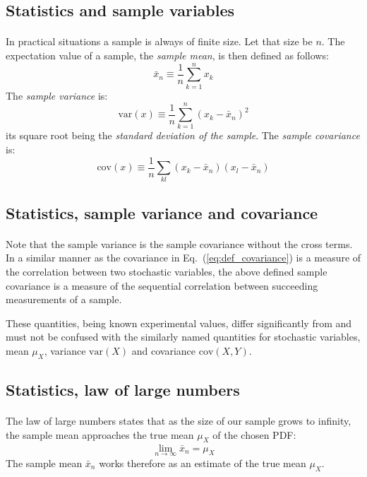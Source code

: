 \documentclass[%
oneside,                 %
final,                   %
10pt]{article}
\begin{document}
\subsection{Statistics and sample variables}

\paragraph{}
In practical situations a sample is always of finite size. Let that
size be $n$. The expectation value of a sample, the \emph{sample mean}, is then defined as follows:
\[
\bar{x}_n \equiv \frac{1}{n}\sum_{k=1}^n x_k
\]
The \emph{sample variance} is:
\[
\mathrm{var}(x) \equiv \frac{1}{n}\sum_{k=1}^n (x_k - \bar{x}_n)^2
\]
its square root being the \emph{standard deviation of the sample}. The
\emph{sample covariance} is:
\[
\mathrm{cov}(x)\equiv\frac{1}{n}\sum_{kl}(x_k - \bar{x}_n)(x_l - \bar{x}_n)
\]



\subsection{Statistics, sample variance and covariance}

\paragraph{}
Note that the sample variance is the sample covariance without the
cross terms. In a similar manner as the covariance in Eq.~(\ref{eq:def_covariance}) is a measure of the correlation between
two stochastic variables, the above defined sample covariance is a
measure of the sequential correlation between succeeding measurements
of a sample.

These quantities, being known experimental values, differ
significantly from and must not be confused with the similarly named
quantities for stochastic variables, mean $\mu_X$, variance $\mathrm{var}(X)$
and covariance $\mathrm{cov}(X,Y)$.



\subsection{Statistics, law of large numbers}

\paragraph{}
The law of large numbers
states that as the size of our sample grows to infinity, the sample
mean approaches the true mean $\mu_X^{\phantom X}$ of the chosen PDF:
\[
\lim_{n\to\infty}\bar{x}_n = \mu_X^{\phantom X}
\]
The sample mean $\bar{x}_n$ works therefore as an estimate of the true
mean $\mu_X^{\phantom X}$.
\end{document}
